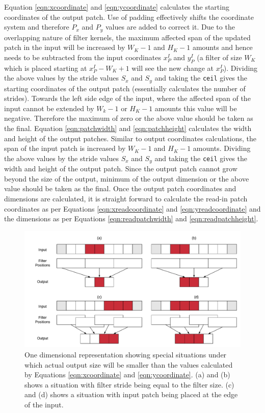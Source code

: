 Equation \ref{eqn:xcoordinate} and \ref{eqn:ycoordinate} calculates the starting coordinates of the output patch.
Use of padding effectively shifts the coordinate system and therefore $P_x$ and $P_y$ values are added to correct it.
Due to the overlapping nature of filter kernels, the maximum affected span of the updated patch in the input will be increased by $W_K-1$ and $H_K-1$ amounts and hence needs to be subtracted from the input coordinates $x^I_P$ and $y^I_P$ (a filter of size $W_K$ which is placed starting at $x^I_P - W_K + 1$ will see the new change at $x^I_P$).
Dividing the above values by the stride values $S_x$ and $S_y$ and taking the \texttt{ceil} gives the starting coordinates of the output patch (essentially calculates the number of strides).
Towards the left side edge of the input, where the affected span of the input cannot be extended by $W_k-1$ or $H_K-1$ amounts this value will be negative.
Therefore the maximum of zero or the above value should be taken as the final.
Equation \ref{eqn:patchwidth} and \ref{eqn:patchheight} calculates the width and height of the output patches.
Similar to output coordinates calculations, the span of the input patch is increased by $W_K-1$ and $H_K-1$ amounts.
Dividing the above values by the stride values $S_x$ and $S_y$ and taking the \texttt{ceil} gives the width and height of the output patch.
Since the output patch cannot grow beyond the size of the output, minimum of the output dimension or the above value should be taken as the final.
Once the output patch coordinates and dimensions are calculated, it is straight forward to calculate the read-in patch coordinates as per Equations \ref{eqn:xreadcoordinate} and \ref{eqn:yreadcoordinate} and the dimensions as per Equations \ref{eqn:readpatchwidth} and \ref{eqn:readpatchheight}.


\begin{figure}[t]
\includegraphics[width=\columnwidth]{images/less_one_example}
\caption{One dimensional representation showing special situations under which actual output size will be smaller than the values calculated by Equations \ref{eqn:xcoordinate} and \ref{eqn:ycoordinate}. (a) and (b) shows a situation with filter stride being equal to the filter size. (c) and (d) shows a situation with input patch being placed at the edge of the input.}
\label{fig:less_one_example}
\end{figure}

